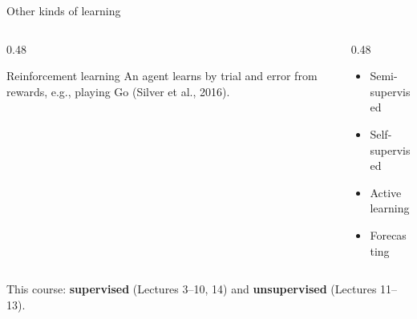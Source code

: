 \documentclass[handout,aspectratio=169,t,9pt]{beamer}
\begin{document}
\begin{frame}{Other kinds of learning}
  \begin{columns}[T,onlytextwidth]
    \begin{column}{0.48\textwidth}
      \begin{sibbox}{Reinforcement learning}
        An agent learns by trial and error from rewards,
        e.g., playing Go (Silver et al., 2016).
      \end{sibbox}
    \end{column}
    \begin{column}{0.48\textwidth}
      \begin{itemize}
        \item Semi-supervised
        \item Self-supervised
        \item Active learning
        \item Forecasting
      \end{itemize}
    \end{column}
  \end{columns}

  \vfill
  \begin{takeaway}
    This course: \textbf{supervised} (Lectures 3--10, 14) and
    \textbf{unsupervised} (Lectures 11--13).
  \end{takeaway}

\end{frame}
\end{document}
